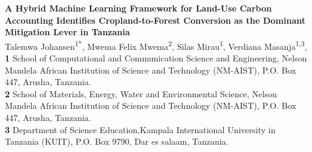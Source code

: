 \documentclass[10pt,letterpaper]{article}
\begin{document}
\vspace*{0.2in}

\begin{flushleft}
{\Large
\textbf{A Hybrid Machine Learning Framework for Land-Use Carbon Accounting Identifies Cropland-to-Forest Conversion as the Dominant Mitigation Lever in Tanzania} %
}
\newline
\\
Talemwa Johansen\textsuperscript{1*},
Mwema Felix Mwema\textsuperscript{2},
Silas Mirau\textsuperscript{1},
Verdiana Masanja\textsuperscript{1,3},
\\
\bigskip
\textbf{1} School of Computational and Communication Science and Engineering, Nelson Mandela African Institution of Science and Technology (NM-AIST), P.O. Box 447, Arusha, Tanzania.
\\
\textbf{2} School of Materials, Energy, Water and Environmental Science, Nelson Mandela African Institution of Science and Technology (NM-AIST), P.O. Box 447, Arusha, Tanzania.
\\
\textbf{3} Department of Science Education,Kampala International University in Tanzania (KUIT), P.O. Box 9790, Dar es salaam, Tanzania.
\\
\bigskip

% 
%






\end{flushleft}
\end{document}
